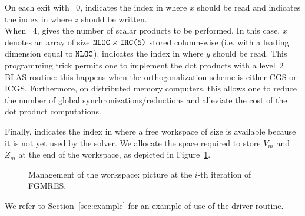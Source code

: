 On each exit with ~0,  indicates the index in
 where $x$ should be read and   indicates the
index in  where $z$ should be written.\\

When ~4,  gives the number of scalar products
to be performed. In this case, $x$ denotes an array of size $\verba{NLOC} \times
\verba{IRC(5)}$ stored column-wise (i.e. with a leading dimension equal to $\verba{NLOC}$).
 indicates the index in  where $y$ should be read.
This programming trick permits one to implement the  dot products with a level~2 BLAS
routine: this happens when the orthogonalization scheme is either CGS or
ICGS. 
Furthermore, on distributed memory computers, this allows one to reduce the number
of global synchronizations/reductions and alleviate the cost of the dot product
computations.

Finally,  indicates the index in  where a free workspace of size
 is available because it is not yet used by the solver.
We allocate the space required to store $V_m$ and $Z_m$ 
at the end of the workspace, as depicted in Figure~\ref{fig:memManagemt}.
\begin{figure}[htb]
\centerline{ }
\caption{\label{fig:memManagemt} Management of the workspace: picture at the 
$i$-th iteration of FGMRES.}
\end{figure}
We refer to Section~\ref{sec:example} for an example of use of the driver
routine.
%
